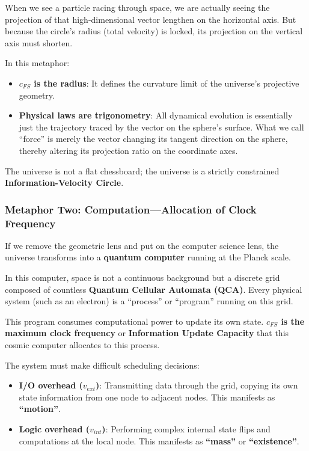 When we see a particle racing through space, we are actually seeing the projection of that high-dimensional vector lengthen on the horizontal axis. But because the circle's radius (total velocity) is locked, its projection on the vertical axis must shorten.

In this metaphor:

\begin{itemize}
\item \textbf{$c_{FS}$ is the radius}: It defines the curvature limit of the universe's projective geometry.

\item \textbf{Physical laws are trigonometry}: All dynamical evolution is essentially just the trajectory traced by the vector on the sphere's surface. What we call ``force'' is merely the vector changing its tangent direction on the sphere, thereby altering its projection ratio on the coordinate axes.
\end{itemize}

The universe is not a flat chessboard; the universe is a strictly constrained \textbf{Information-Velocity Circle}.

\subsubsection{Metaphor Two: Computation---Allocation of Clock Frequency}

If we remove the geometric lens and put on the computer science lens, the universe transforms into a \textbf{quantum computer} running at the Planck scale.

In this computer, space is not a continuous background but a discrete grid composed of countless \textbf{Quantum Cellular Automata (QCA)}. Every physical system (such as an electron) is a ``process'' or ``program'' running on this grid.

This program consumes computational power to update its own state. \textbf{$c_{FS}$ is the maximum clock frequency} or \textbf{Information Update Capacity} that this cosmic computer allocates to this process.

The system must make difficult scheduling decisions:

\begin{itemize}
\item \textbf{I/O overhead ($v_{ext}$)}: Transmitting data through the grid, copying its own state information from one node to adjacent nodes. This manifests as \textbf{``motion''}.

\item \textbf{Logic overhead ($v_{int}$)}: Performing complex internal state flips and computations at the local node. This manifests as \textbf{``mass''} or \textbf{``existence''}.
\end{itemize}

